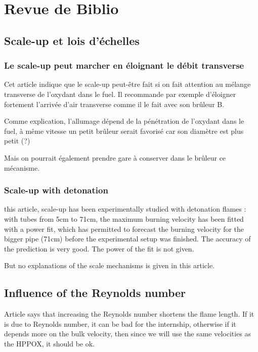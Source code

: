 \renewcommand\evenpagerightmark{{\scshape\small Scan of the literature}}
\chapter[Scan of the literature]%
{Revue de Biblio}
\label{revue_de_biblio}
\section{Scale-up et lois d'échelles}

\subsection{Le scale-up peut marcher en éloignant le débit transverse}
\cite{shigeru_azuhata_scale-up_study_of_gas_composition.pdf_1986}
Cet article indique que le scale-up peut-être fait si on fait attention au mélange transverse de l'oxydant dans le fuel. Il recommande par exemple d'éloigner fortement l'arrivée d'air transverse comme il le fait avec son brûleur B. 

Comme explication, l'allumage dépend de la pénétration de l'oxydant dans le fuel, à même vitesse un petit brûleur serait favorisé car son diamètre est plus petit (?)

Mais on pourrait également prendre gare à conserver dans le brûleur ce mécanisme.

\subsection{Scale-up with detonation}

\cite{fig_experimental_2016} this article, scale-up has been experimentally studied with detonation flames : with tubes from 5cm to 71cm, the maximum burning velocity has been fitted with a power fit, which has permitted to forecast the burning velocity for the bigger pipe (71cm) before the experimental setup was finished. The accuracy of the prediction is very good. The power of the fit is not given.

But no explanations of the scale mechanisms is given in this article.
\section{Influence of the Reynolds number}

Article \cite{milosavljevic_influence_1990}  says that increasing the Reynolds number shortens the flame length. If it is due to Reynolds number, it can be bad for the internship, otherwise if it depends more on the bulk velocity, then since we will use the same velocities as the HPPOX, it should be ok. 

